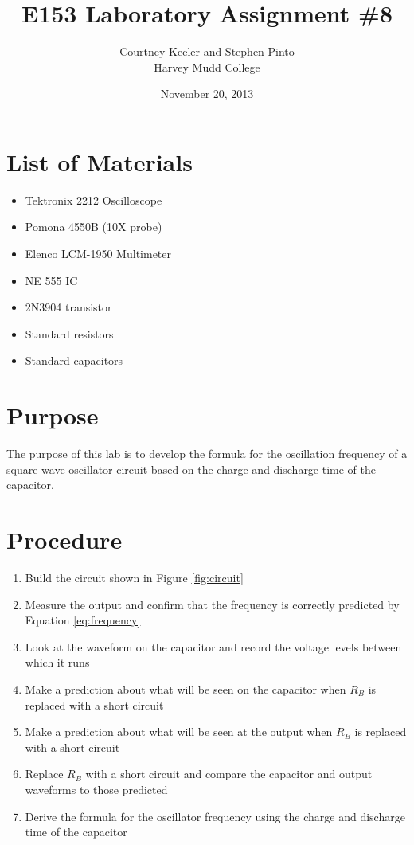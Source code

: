 \documentclass[12pt,letterpaper]{report}
\begin{document}
\title{E153 Laboratory Assignment \#8}
\author{Courtney Keeler and Stephen Pinto\\
Harvey Mudd College}
\date{November 20, 2013}
\maketitle

\section*{List of Materials}
\begin{itemize}
	\item Tektronix 2212 Oscilloscope
	\item Pomona 4550B (10X probe)
	\item Elenco LCM-1950 Multimeter
	\item NE 555 IC
	\item 2N3904 transistor
	\item Standard resistors
	\item Standard capacitors
\end{itemize}

\section*{Purpose}
The purpose of this lab is to develop the formula for the oscillation frequency of a square wave oscillator circuit based on the charge and discharge time of the capacitor.

\section*{Procedure}

\begin{enumerate}
\item Build the circuit shown in Figure \ref{fig:circuit}
\item Measure the output and confirm that the frequency is correctly predicted by Equation \ref{eq:frequency}
\item Look at the waveform on the capacitor and record the voltage levels between which it runs
\item Make a prediction about what will be seen on the capacitor when $R_B$ is replaced with a short circuit
\item Make a prediction about what will be seen at the output when $R_B$ is replaced with a short circuit
\item Replace $R_B$ with a short circuit and compare the capacitor and output waveforms to those predicted 
\item Derive the formula for the oscillator frequency using the charge and discharge time of the capacitor
\end{enumerate}
\end{document}
